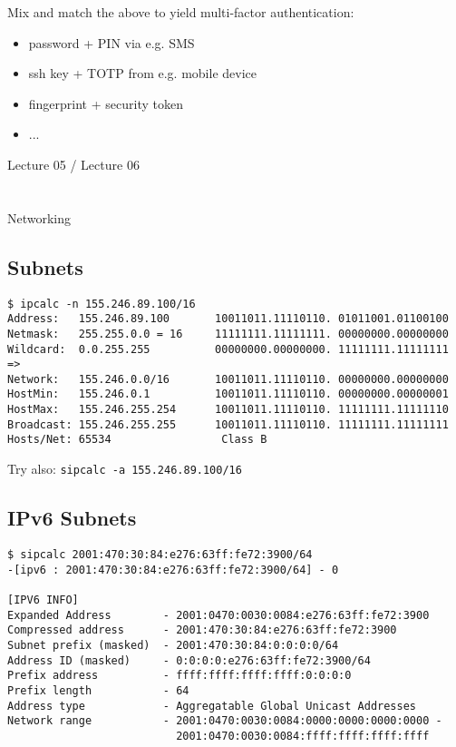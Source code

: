 \documentclass[xga]{xdvislides}
\begin{document}
Mix and match the above to yield multi-factor
authentication:
\begin{itemize}
	\item password + PIN via e.g. SMS
	\item ssh key + TOTP from e.g. mobile device
	\item fingerprint + security token
	\item ...
\end{itemize}


\newpage
\vspace*{\fill}
\begin{center}
    \Hugesize
        Lecture 05 / Lecture 06 \\ [1em]
    \hspace*{5mm}
    \blueline\\
    \hspace*{5mm}\\
	Networking
\end{center}
\vspace*{\fill}

\subsection{Subnets}
\begin{verbatim}
$ ipcalc -n 155.246.89.100/16
Address:   155.246.89.100       10011011.11110110. 01011001.01100100
Netmask:   255.255.0.0 = 16     11111111.11111111. 00000000.00000000
Wildcard:  0.0.255.255          00000000.00000000. 11111111.11111111
=>
Network:   155.246.0.0/16       10011011.11110110. 00000000.00000000
HostMin:   155.246.0.1          10011011.11110110. 00000000.00000001
HostMax:   155.246.255.254      10011011.11110110. 11111111.11111110
Broadcast: 155.246.255.255      10011011.11110110. 11111111.11111111
Hosts/Net: 65534                 Class B
\end{verbatim}
\vspace{.5in}
Try also: \verb+sipcalc -a 155.246.89.100/16+

\subsection{IPv6 Subnets}
\begin{verbatim}
$ sipcalc 2001:470:30:84:e276:63ff:fe72:3900/64
-[ipv6 : 2001:470:30:84:e276:63ff:fe72:3900/64] - 0

[IPV6 INFO]
Expanded Address        - 2001:0470:0030:0084:e276:63ff:fe72:3900
Compressed address      - 2001:470:30:84:e276:63ff:fe72:3900
Subnet prefix (masked)  - 2001:470:30:84:0:0:0:0/64
Address ID (masked)     - 0:0:0:0:e276:63ff:fe72:3900/64
Prefix address          - ffff:ffff:ffff:ffff:0:0:0:0
Prefix length           - 64
Address type            - Aggregatable Global Unicast Addresses
Network range           - 2001:0470:0030:0084:0000:0000:0000:0000 -
                          2001:0470:0030:0084:ffff:ffff:ffff:ffff

\end{verbatim}
\end{document}

